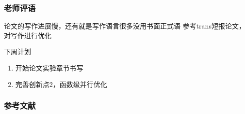 \documentclass[slide]{../../custom}
\begin{document}
\begin{frame}
  \frametitle{老师评语}
  \begin{alertblock}{论文的写作进展慢，还有就是写作语言很多没用书面正式语}
  参考trans短报论文，对写作进行优化
  \end{alertblock}
  \vfill
  \begin{block}{下周计划}
    \begin{enumerate}
        \item 开始论文实验章节书写
        \item 完善创新点2，函数级并行优化
    \end{enumerate}
  \end{block}
\end{frame}

\begin{frame}
  \frametitle{参考文献}
  
  
\end{frame}
\end{document}
